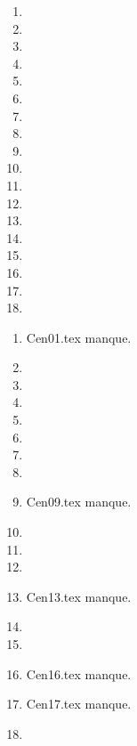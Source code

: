  
 
\begin{enumerate}
  \item  
  \item  
  \item  
  \item  
  \item  
  \item  
  \item  
  \item  
  \item  
  \item  
  \item  
  \item  
  \item  
  \item  
  \item  
  \item  
  \item  
  \item  
\end{enumerate} 
\clearpage 
{}
\begin{enumerate}
  \item Cen01.tex manque. 
  \item  
  \item  
  \item  
  \item  
  \item  
  \item  
  \item  
  \item Cen09.tex manque. 
  \item  
  \item  
  \item  
  \item Cen13.tex manque. 
  \item  
  \item  
  \item Cen16.tex manque. 
  \item Cen17.tex manque. 
  \item  
\end{enumerate} 
